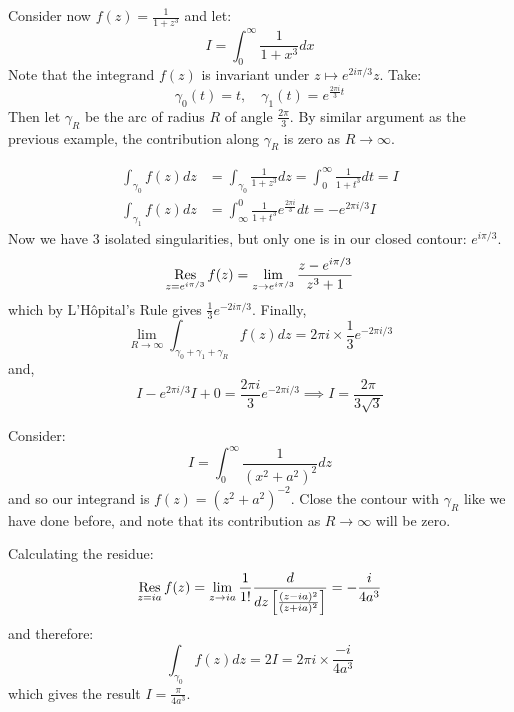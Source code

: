\documentclass[../Main.tex]{subfiles}
\begin{document}
\begin{example}
    Consider now $f(z) = \frac{1}{1 + z^3}$ and let:
    \begin{equation*}
        I = \int_0^\infty \frac{1}{1 + x^3} dx
    \end{equation*}
    Note that the integrand $f(z)$ is invariant under $z \mapsto e^{2 i \pi / 3} z$. Take:
    \begin{equation*}
        \gamma_0(t) = t,\quad\gamma_1(t) = e^{\frac{2\pi i}{3}t}
    \end{equation*}
    Then let $\gamma_R$ be the arc of radius $R$ of angle $\frac{2\pi}{3}$.
    By similar argument as the previous example, the contribution along $\gamma_R$ is zero as $R \to \infty$.

    \begin{align*}
        \int_{\gamma_0} f(z) dz &= \int_{\gamma_0} \frac{1}{1 + z^3} dz = \int_0^\infty \frac{1}{1 + t^3} dt = I \\
        \int_{\gamma_1} f(z) dz &= \int_{\infty}^0 \frac{1}{1 + t^3} e^{\frac{2\pi i}{3}} dt = -e^{2\pi i / 3} I
    \end{align*}
    Now we have 3 isolated singularities, but only one is in our closed contour: $e^{i \pi / 3}$.
    \begin{equation*}
        \operatorname*{Res}_{z = e^{i \pi / 3}} f(z) = \lim_{z \to e^{i \pi / 3}} \frac{z - e^{i \pi / 3}}{z^3 + 1}
    \end{equation*}
    which by L'H\^opital's Rule gives $\frac13 e^{-2i \pi / 3}$. Finally,
    \begin{equation*}
        \lim_{R \to \infty} \int_{\gamma_0 + \gamma_1 + \gamma_R} f(z) dz = 2\pi i \times \frac13 e^{-2 \pi i / 3}
    \end{equation*}
    and,
    \begin{equation*}
        I - e^{2\pi i / 3}I + 0 = \frac{2\pi i}{3} e^{-2 \pi i / 3} \implies I = \frac{2\pi}{3\sqrt{3}}
    \end{equation*}
\end{example}
\begin{example}
    Consider:
    \begin{equation*}
        I = \int_0^\infty \frac{1}{(x^2 + a^2)^2} dz
    \end{equation*}
    and so our integrand is $f(z) = (z^2 + a^2)^{-2}$. Close the contour with $\gamma_R$ like we have done before, and note that its contribution as $R \to \infty$ will be zero.
    
    Calculating the residue:
    \begin{equation*}
        \operatorname*{Res}_{z = i a} f(z) = \lim_{z \to ia} \frac1{1!} \frac{d}{dz \left[\frac{(z - ia)^2}{(z+ia)^2}\right]} = -\frac{i}{4a^3}
    \end{equation*}
    and therefore:
    \begin{equation*}
        \int_{\gamma_0} f(z) dz = 2I = 2\pi i \times \frac{-i}{4a^3}
    \end{equation*}
    which gives the result $I = \frac{\pi}{4a^3}$.
\end{example}
\end{document}
